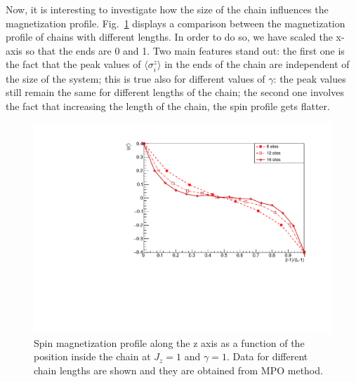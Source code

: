 

Now, it is interesting to investigate how the size of the chain influences the magnetization profile. Fig.~\ref{fig:LM_comparisonVSsizeJz1Gamma1} displays a comparison between the magnetization profile of chains with different lengths. In order to do so, we have scaled the x-axis so that the ends are 0 and 1. Two main features stand out: the first one is the fact that the peak values of $\langle\sigma_i^z\rangle$ in the ends of the chain are independent of the size of the system; this is true also for different values of $\gamma$: the peak values still remain the same for different lengths of the chain; the second one involves the fact that increasing the length of the chain, the spin profile gets flatter.

\begin{figure}[H]
    \centering
    \includegraphics[scale=0.7]{Figures/NORM_LM_comparisonVSsize.pdf}
    \captionsetup{width=1.\linewidth}
    \caption{Spin magnetization profile along the z axis as a function of the position inside the chain at $J_z = 1$ and $\gamma=1$. Data for different chain lengths are shown and they are obtained from MPO method.}
    \label{fig:LM_comparisonVSsizeJz1Gamma1}
\end{figure}

